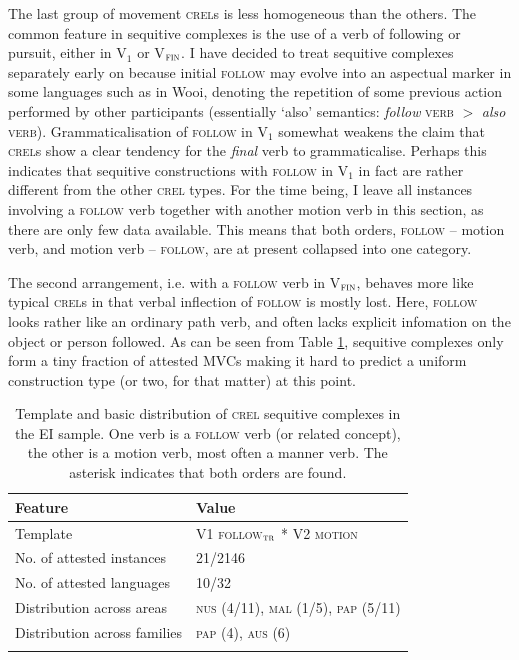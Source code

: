 The last group of movement \textsc{crel}s is less homogeneous than the others. The common feature in sequitive complexes is the use of a verb of following or pursuit, either in V$_{1}$ or V$_{\textsc{fin}}$. I have decided to treat sequitive complexes separately early on because initial \textsc{follow} may evolve into an aspectual marker in some languages such as in Wooi, denoting the repetition of some previous action performed by other participants (essentially `also' semantics: \textit{follow} \textsc{verb} $>$ \textit{also} \textsc{verb}). Grammaticalisation of \textsc{follow} in V$_{1}$ somewhat weakens the claim that \textsc{crel}s show a clear tendency for the \emph{final} verb to grammaticalise. Perhaps this indicates that sequitive constructions with \textsc{follow} in V$_{1}$ in fact are rather different from the other \textsc{crel} types. For the time being, I leave all instances involving a \textsc{follow} verb together with another motion verb in this section, as there are only few data available. This means that both orders, \textsc{follow} -- motion verb, and motion verb -- \textsc{follow}, are at present collapsed into one category.

The second arrangement, i.e. with a \textsc{follow} verb in V$_{\textsc{fin}}$, behaves more like typical \textsc{crel}s in that verbal inflection of \textsc{follow} is mostly lost. Here, \textsc{follow} looks rather like an ordinary path verb, and often lacks explicit infomation on the object or person followed. As can be seen from Table \ref{table:basiccrelseq}, sequitive complexes only form a tiny fraction of attested MVCs making it hard to predict a uniform construction type (or two, for that matter) at this point.

\begin{table}
\begin{tabular}{ll}
\lsptoprule
Feature&Value\tabularnewline
\hline
Template&V1 \textsc{follow$_{\textsc{tr}}$} * V2 \textsc{motion}\tabularnewline
No. of attested instances& 21/2146 \tabularnewline
No. of attested languages& 10/32 \tabularnewline
Distribution across areas& \textsc{nus} (4/11), \textsc{mal} (1/5), \textsc{pap} (5/11) \tabularnewline
Distribution across families& \textsc{pap} (4), \textsc{aus} (6) \tabularnewline
\lspbottomrule
\end{tabular}
\caption[Template and basic distribution of \textsc{crel} sequitive complexes]{Template and basic distribution of \textsc{crel} sequitive complexes in the EI sample. One verb is a \textsc{follow} verb (or related concept), the other is a motion verb, most often a manner verb. The asterisk indicates that both orders are found.}
\label{table:basiccrelseq}
\end{table}

